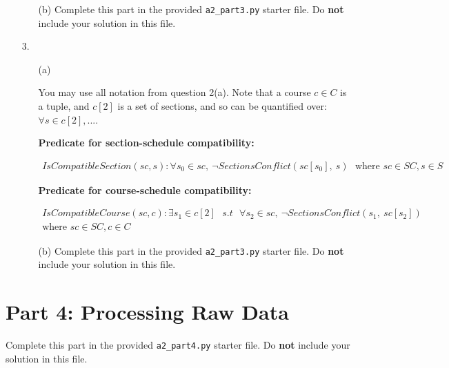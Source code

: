 \documentclass[fontsize=11pt]{article}
\begin{document}
\begin{enumerate}
\begin{enumerate}
\item[(b)]
Complete this part in the provided \texttt{a2\_part3.py} starter file.
Do \textbf{not} include your solution in this file.
\end{enumerate}

\item[3.]

\begin{enumerate}
\item[(a)]

You may use all notation from question 2(a).
Note that a course $c \in C$ is a tuple, and $c[2]$ is a set of sections, and so can be quantified over: $\forall s \in c[2], ...$.

\smallskip

\textbf{Predicate for section-schedule compatibility:}

\begin{align*}
IsCompatibleSection(sc, s) : \text{$\forall s_0 \in sc,~ \lnot SectionsConflict(sc[s_0], ~s)$ } \text{where $sc \in SC, s \in S$}
\end{align*}

\smallskip

\textbf{Predicate for course-schedule compatibility:}

\begin{align*}
IsCompatibleCourse(sc, c) : \text{$\exists s_1 \in c[2]$ } s.t \text{ $\forall s_2 \in sc, ~\lnot SectionsConflict(s_1, ~sc[s_2])$ } \\ \text{where $sc \in SC, c \in C$}
\end{align*}

\item[(b)]
Complete this part in the provided \texttt{a2\_part3.py} starter file.
Do \textbf{not} include your solution in this file.
\end{enumerate}

\end{enumerate}

\section*{Part 4: Processing Raw Data}
Complete this part in the provided \texttt{a2\_part4.py} starter file.
Do \textbf{not} include your solution in this file.
\end{document}
